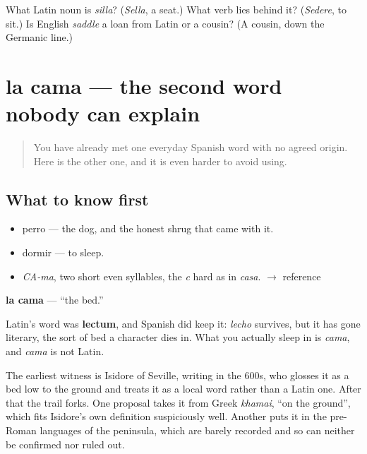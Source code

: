 \begin{tcolorbox}[breakable,colback=teal!4,colframe=teal!35!black,title={Before you move on}]
What Latin noun is \emph{silla}? (\emph{Sella}, a seat.) What verb lies behind it? (\emph{Sedere}, to sit.) Is English \emph{saddle} a loan from Latin or a cousin? (A cousin, down the Germanic line.)
\end{tcolorbox}
\section[la cama]{la cama — the second word nobody can explain}

\label{lesson:ES-C279-cama}



\begin{quote}
You have already met one everyday Spanish word with no agreed origin. Here is the other one, and it is even harder to avoid using.
\end{quote}

\subsection*{What to know first}
\begin{itemize}
\raggedright
  \item perro — the dog, and the honest shrug that came with it.
  \item dormir — to sleep.
\end{itemize}

\begin{sounds}
\begin{itemize}
\raggedright
  \item \emph{CA-ma}, two short even syllables, the \emph{c} hard as in \emph{casa}. $\to$ reference
\end{itemize}
\end{sounds}

\begin{cousinweb}
\textbf{la cama} — \textquotedblleft{}the bed.\textquotedblright{}

Latin's word was \textbf{lectum}, and Spanish did keep it: \emph{lecho} survives, but it has gone literary, the sort of bed a character dies in. What you actually sleep in is \emph{cama}, and \emph{cama} is not Latin.

The earliest witness is Isidore of Seville, writing in the 600s, who glosses it as a bed low to the ground and treats it as a local word rather than a Latin one. After that the trail forks. One proposal takes it from Greek \emph{khamai}, \textquotedblleft{}on the ground\textquotedblright{}, which fits Isidore's own definition suspiciously well. Another puts it in the pre-Roman languages of the peninsula, which are barely recorded and so can neither be confirmed nor ruled out.
\end{cousinweb}

